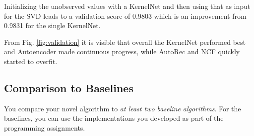 \documentclass[10pt,conference,compsocconf]{IEEEtran}
\begin{document}
    Initializing the unobserved values with a KernelNet and then using that as input for the SVD leads to a validation score of 0.9803 which is an improvement from 0.9831 for the single KernelNet.

    
    From Fig. \ref{fig:validation} it is visible that overall the KernelNet performed best and Autoencoder made continuous progress, while AutoRec and NCF quickly started to overfit. 

    \subsection{Comparison to Baselines}

    You compare your novel algorithm to \emph{at least two baseline
    algorithms}. For the baselines, you can use the implementations you
    developed as part of the programming assignments.
\end{document}
